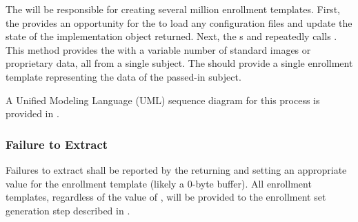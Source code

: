 The \lib will be responsible for creating several million enrollment templates.
First, the \testdriver provides an opportunity for the \lib to load any
configuration files and update the state of the implementation object returned.
Next, the \testdriver {}s and repeatedly calls
. This method provides the \lib with a variable
number of standard images or proprietary \scanner data, all from a single
subject. The \lib should provide a single enrollment template representing the
data of the passed-in subject.

A Unified Modeling Language (UML) sequence diagram for this process is provided
in .

\subsubsection{Failure to Extract}
Failures to extract shall be reported by the \lib returning
 and setting an appropriate value for the
enrollment template (likely a 0-byte buffer). All enrollment templates,
regardless of the value of , will be provided to
the enrollment set generation step described in .

